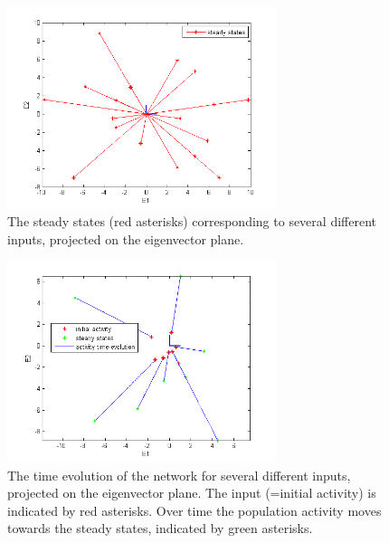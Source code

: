 \documentclass{scrartcl}
\begin{document}
\begin{figure}[h]
\centering
\includegraphics[trim = {0.6cm 0 1.2cm 0.7cm}, width=0.7\textwidth, clip]{../pics/steady}
\caption{The steady states (red asterisks) corresponding to several different inputs, projected on the eigenvector plane.}
\label{label}
\end{figure}

\begin{figure}[h]
\centering
\includegraphics[trim = {0.6cm 0 1.2cm 0.7cm}, width=0.7\textwidth, clip]{../pics/time_evo}
\caption{The time evolution of the network for several different inputs, projected on the eigenvector plane. The input (=initial activity) is indicated by red asterisks. Over time the population activity moves towards the steady states, indicated by green asterisks.}
\label{label}
\end{figure}
\end{document}
